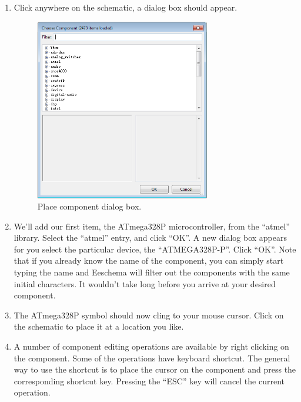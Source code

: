 \documentclass[12pt,letterpaper]{scrartcl}
\begin{document}
\begin{enumerate}
\begin{enumerate}
			\item Click anywhere on the schematic, a dialog box should appear. 
				\begin{figure}[h]
					\centering
					\includegraphics[width=3in]{place-component.png}
					\caption{Place component dialog box.}
					\label{fig:place-component}
				\end{figure}

			\item We’ll add our first item, the ATmega328P microcontroller, from the ``atmel'' library. Select the ``atmel'' entry, and click ``OK''. A new dialog box appears for you select the particular device, the “ATMEGA328P-P”. Click ``OK''. Note that if you already know the name of the component, you can simply start typing the name and Eeschema will filter out the components with the same initial characters. It wouldn't take long before you arrive at your desired component.
			
			\item The ATmega328P symbol should now cling to your mouse cursor. Click on the schematic to place it at a location you like. 
			\item A number of component editing operations are available by right clicking on the component. Some of the operations have keyboard shortcut. The general way to use the shortcut is to place the cursor on the component and press the corresponding shortcut key. Pressing the ``ESC'' key will cancel the current operation. 
			

\end{enumerate}
\end{enumerate}
\end{document}
